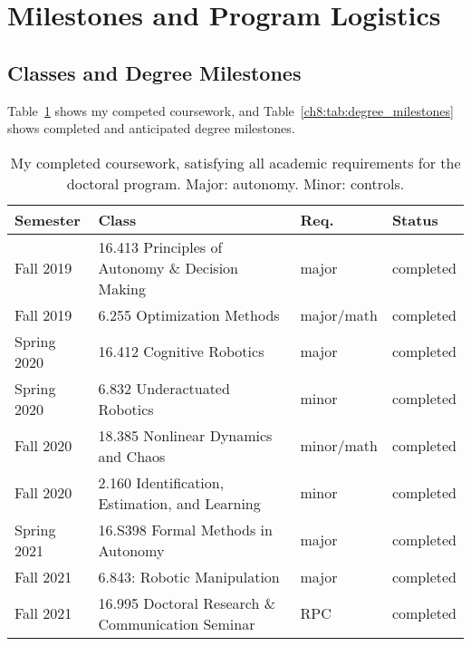
\section{Milestones and Program Logistics}\label{section:planning}

\subsection{Classes and Degree Milestones}

Table~\ref{ch8:tab:course_requirements} shows my competed coursework, and Table~\ref{ch8:tab:degree_milestones} shows completed and anticipated degree milestones.

\begin{table}[h]
    \centering
    \caption{My completed coursework, satisfying all academic requirements for the doctoral program. Major: autonomy. Minor: controls.}
    \label{ch8:tab:course_requirements}
    \begin{tabular}{llll}
        Semester    & Class                                             & Req.       & Status    \\ \hline
        Fall 2019   & 16.413 Principles of Autonomy \& Decision Making  & major      & completed \\
        Fall 2019   & 6.255 Optimization Methods                        & major/math & completed \\
        Spring 2020 & 16.412 Cognitive Robotics                         & major      & completed \\
        Spring 2020 & 6.832 Underactuated Robotics                      & minor      & completed \\
        Fall 2020   & 18.385 Nonlinear Dynamics and Chaos               & minor/math & completed \\
        Fall 2020   & 2.160 Identification, Estimation, and Learning    & minor      & completed \\
        Spring 2021 & 16.S398 Formal Methods in Autonomy                & major      & completed \\
        Fall 2021   & 6.843: Robotic Manipulation                       & major      & completed \\
        Fall 2021   & 16.995 Doctoral Research \& Communication Seminar & RPC        & completed
    \end{tabular}
\end{table}

